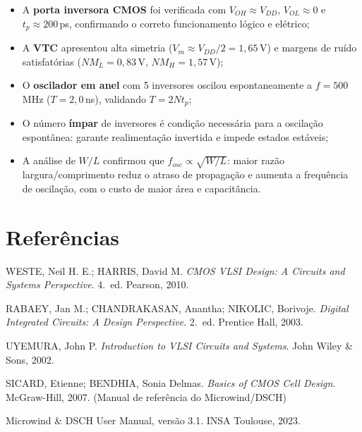 \documentclass[12pt,a4paper]{article}
\begin{document}
\begin{itemize}[leftmargin=1.5cm]
  \item A \textbf{porta inversora CMOS} foi verificada com $V_{OH} \approx V_{DD}$,
        $V_{OL} \approx 0$ e $t_p \approx 200$\,ps, confirmando o correto
        funcionamento lógico e elétrico;

  \item A \textbf{VTC} apresentou alta simetria ($V_m \approx V_{DD}/2 = 1{,}65$\,V)
        e margens de ruído satisfatórias ($NM_L = 0{,}83$\,V, $NM_H = 1{,}57$\,V);

  \item O \textbf{oscilador em anel} com 5 inversores oscilou espontaneamente a
        $f = 500$\,MHz ($T = 2{,}0$\,ns), validando $T = 2Nt_p$;

  \item O número \textbf{ímpar} de inversores é condição necessária para a
        oscilação espontânea: garante realimentação invertida e impede estados estáveis;

  \item A análise de $W/L$ confirmou que $f_{osc} \propto \sqrt{W/L}$: maior
        razão largura/comprimento reduz o atraso de propagação e aumenta a
        frequência de oscilação, com o custo de maior área e capacitância.
\end{itemize}

\section*{Referências}

\begin{enumerate}[leftmargin=1.5cm, label={[\arabic*]}]
  \item WESTE, Neil H. E.; HARRIS, David M. \textit{CMOS VLSI Design: A Circuits
        and Systems Perspective}. 4.\ ed. Pearson, 2010.
  \item RABAEY, Jan M.; CHANDRAKASAN, Anantha; NIKOLIC, Borivoje.
        \textit{Digital Integrated Circuits: A Design Perspective}. 2.\ ed.
        Prentice Hall, 2003.
  \item UYEMURA, John P. \textit{Introduction to VLSI Circuits and Systems}.
        John Wiley \& Sons, 2002.
  \item SICARD, Etienne; BENDHIA, Sonia Delmas. \textit{Basics of CMOS Cell Design}.
        McGraw-Hill, 2007. (Manual de referência do Microwind/DSCH)
  \item Microwind \& DSCH User Manual, versão 3.1. INSA Toulouse, 2023.
\end{enumerate}
\end{document}
